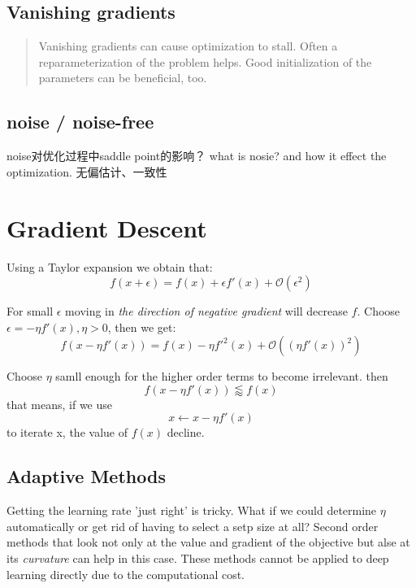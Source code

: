 \subsection{Vanishing gradients}
\begin{quotation}
    Vanishing gradients can cause optimization to stall. Often a reparameterization of the problem
     helps. Good initialization of the parameters can be beneficial, too.\cite{zhang2020dive}
\end{quotation}

\subsection{noise / noise-free}
noise对优化过程中saddle point的影响？
what is nosie? and how it effect the optimization.
无偏估计、一致性

\section{Gradient Descent}
Using a Taylor expansion we obtain that:
\begin{equation}
    f(x + \epsilon) = f(x) + \epsilon f'(x) + \mathcal{O} (\epsilon^2)
\end{equation}
\par
For small $\epsilon$ moving in \textit{the direction of negative gradient} will decrease $f$. Choose $\epsilon = 
-\eta f'(x), \eta > 0$, then we get:
\begin{equation}
    f(x - \eta f'(x)) = f(x) - \eta f'^2(x) + \mathcal{O} ((\eta f'(x))^2)
\end{equation}
\par Choose $\eta$ samll enough for the higher order terms to become irrelevant. then
\begin{equation}
    f(x - \eta f'(x)) \lessapprox f(x)
\end{equation}
that means, if we use 
\begin{equation}
    x \leftarrow x - \eta f'(x)
\end{equation}
to iterate x, the value of $f(x)$ decline.

\subsection{Adaptive Methods}
Getting the learning rate 'just right' is tricky. What if we could determine $\eta$ automatically or get rid of having to select
a setp size at all? Second order methods that look not only at the value and gradient of the objective but alse at its \textit{curvature}
can help in this case. These methods cannot be applied to deep learning directly due to the computational cost.

